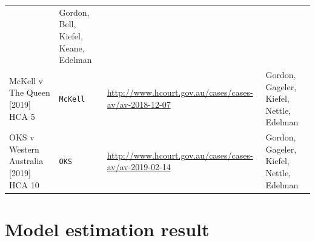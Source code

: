 \documentclass{monashthesis}
\begin{document}
\begin{longtable}[]{@{}llll@{}}
\begin{minipage}[t]{0.30\columnwidth}
\end{minipage} & \begin{minipage}[t]{0.22\columnwidth}\raggedright
Gordon, Bell, Kiefel, Keane, Edelman\strut
\end{minipage}\tabularnewline
\begin{minipage}[t]{0.22\columnwidth}\raggedright
McKell v The Queen {[}2019{]} HCA 5\strut
\end{minipage} & \begin{minipage}[t]{0.15\columnwidth}\raggedright
\texttt{McKell}\strut
\end{minipage} & \begin{minipage}[t]{0.30\columnwidth}\raggedright
\url{http://www.hcourt.gov.au/cases/cases-av/av-2018-12-07}\strut
\end{minipage} & \begin{minipage}[t]{0.22\columnwidth}\raggedright
Gordon, Gageler, Kiefel, Nettle, Edelman\strut
\end{minipage}\tabularnewline
\begin{minipage}[t]{0.22\columnwidth}\raggedright
OKS v Western Australia {[}2019{]} HCA 10\strut
\end{minipage} & \begin{minipage}[t]{0.15\columnwidth}\raggedright
\texttt{OKS}\strut
\end{minipage} & \begin{minipage}[t]{0.30\columnwidth}\raggedright
\url{http://www.hcourt.gov.au/cases/cases-av/av-2019-02-14}\strut
\end{minipage} & \begin{minipage}[t]{0.22\columnwidth}\raggedright
Gordon, Gageler, Kiefel, Nettle, Edelman\strut
\end{minipage}\tabularnewline
\bottomrule
\end{longtable}

\hypertarget{model-estimation-result}{%
\section{Model estimation result}\label{model-estimation-result}}
\end{document}
